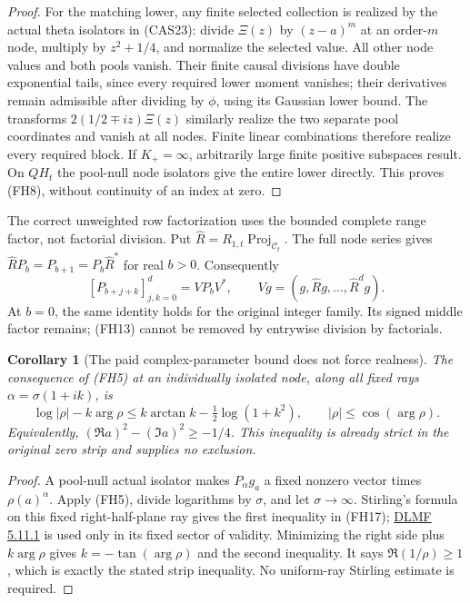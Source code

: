 \documentclass[11pt]{article}
\newtheorem{corollary}[theorem]{Corollary}
\theoremstyle{remark}\newtheorem{remark}[theorem]{Remark}
\begin{document}
\begin{proof}
For the matching lower, any finite selected collection is realized
by the actual theta isolators in (CAS23): divide \(\Xi(z)\) by
\((z-a)^m\) at an order-\(m\) node, multiply by \(z^2+1/4\),
and normalize the selected value. All other node values and both
pools vanish. Their finite causal divisions have double exponential
tails, since every required lower moment vanishes; their derivatives
remain admissible after dividing by \(\phi\), using its Gaussian
lower bound. The transforms \(2(1/2\mp iz)\Xi(z)\) similarly realize
the two separate pool coordinates and vanish at all nodes. Finite
linear combinations therefore realize every required block. If
\(K_+=\infty\), arbitrarily large finite positive subspaces result.
On \(QH_t\) the pool-null node isolators give the entire lower directly.
This proves (FH8), without continuity of an index at zero.
\end{proof}

The correct unweighted row factorization uses the bounded complete
range factor, not factorial division. Put
\(\widehat R=R_{1,t}\operatorname{Proj}_{\mathcal C_t}\).
The full node series gives \(\widehat RP_b=P_{b+1}=P_b\widehat R^*\)
for real \(b>0\). Consequently
\[
 [P_{b+j+k}]_{j,k=0}^d=V P_bV^*,\qquad
 Vg=(g,\widehat Rg,\ldots,\widehat R^dg).                 \tag{FH16}
\]
At \(b=0\), the same identity holds for the original integer family.
Its signed middle factor remains; (FH13) cannot be removed by
entrywise division by factorials.

\begin{corollary}[The paid complex-parameter bound does not force realness]
\label{cor:fractional-complex-cost}
The consequence of (FH5) at an individually isolated node, along all
fixed rays \(\alpha=\sigma(1+ik)\), is
\[
 \log|\rho|-k\arg\rho
   \le k\arctan k-\tfrac12\log(1+k^2),\qquad
 |\rho|\le\cos(\arg\rho).                               \tag{FH17}
\]
Equivalently, \((\Re a)^2-(\Im a)^2\ge-1/4\). This inequality is
already strict in the original zero strip and supplies no exclusion.
\end{corollary}

\begin{proof}
A pool-null actual isolator makes \(P_\alpha g_a\) a fixed nonzero
vector times \(\rho(a)^\alpha\). Apply (FH5), divide logarithms by
\(\sigma\), and let \(\sigma\to\infty\). Stirling's formula on this
fixed right-half-plane ray gives the first inequality in (FH17);
\href{https://dlmf.nist.gov/5.11.E1}{DLMF 5.11.1} is used only in
its fixed sector of validity. Minimizing the right side plus
\(k\arg\rho\) gives \(k=-\tan(\arg\rho)\) and the second inequality.
It says \(\Re(1/\rho)\ge1\), which is exactly the stated strip
inequality. No uniform-ray Stirling estimate is required.
\end{proof}
\end{document}
